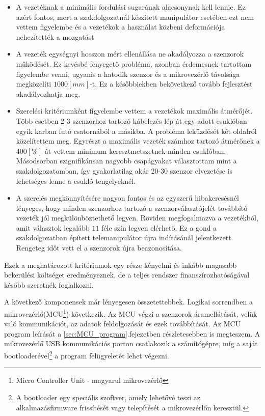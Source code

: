 \begin{itemize}
  \item A vezetéknak a minimális fordulási sugarának alacsonynak kell lennie. Ez azért fontos, mert a szakdolgozatnál készített manipulátor esetében ezt nem vettem figyelembe és a vezetékok a használat közbeni deformációja nehezítették a mozgatást
  \item A vezeték egységnyi hosszon mért ellenállása ne akadályozza a szenzorok működését. Ez kevésbé fenyegető probléma, azonban érdemesnek tartottam figyelembe venni, ugyanis a hatodik szenzor és a mikrovezérlő távolsága megközelíti $1000[mm]$-t. Ez a későbbiekben bekövetkező tovább fejlesztést akadályozhatja meg.
  \item Szerelési kritériumként figyelembe vettem a vezetékok maximális átmérőjét. Több esetben 2-3 szenzorhoz tartozó kábelezés lép át egy adott csuklóban egyik karban futó csatornából a másikba. A probléma leküzdését két oldalról közelítettem meg. Egyrészt a maximális vezeték számhoz tartozó átmérőnek a $400[\%]$-át vettem minimum keresztmetszetnek minden csuklóban. Másodsorban szignifikánsan nagyobb csapágyakat választottam mint a szakdolgozatomban, így gyakorlatilag akár 20-30 szenzor elvezetése is lehetséges lenne a csukló tengelyeknél.
  \item A szerelés megkönnyítésére nagyon fontos és az egyszerű hibakeresésnél lényeges, hogy minden szenzorhoz tartozó a szenzorválasztójelét továbbító vezeték jól megkülönböztethető legyen. Röviden megfogalmazva a vezetékból, amit választok legalább $11$ féle szín legyen elérhető. Ez a gond a szakdolgozatban épített telemanipulátor újra indításánál jelentkezett. Rengeteg időt vett el a szenzorok újra beazonosítása.
\end{itemize}

Ezek a meghatározott kritériumok egy része kényelmi és inkább magasabb bekerülési költséget eredményeznek, de a teljes rendszer finanszírozhatóságával később szeretnék foglalkozni.

A következő komponensek már lényegesen összetettebbek. Logikai sorrendben a mikrovezérlő(MCU\footnote{Micro Controller Unit - magyarul mikrovezérlő}) következik. Az MCU végzi a szenzorok áramellátását, velük való kommunikációt, az adatok feldolgozását és ezek továbbítását. Az MCU program leírását a \ref{sec:MCU_program}.fejezetben részletesebben is megteszem. A mikrovezérlő USB kommunikációs porton csatlakozik a számítógépre, míg a saját bootloaderével\footnote{A bootloader egy speciális szoftver, amely lehetővé teszi az alkalmazásfirmware frissítését vagy telepítését a mikrovezérlőn keresztül.} a program felügyeletét lehet végezni.

